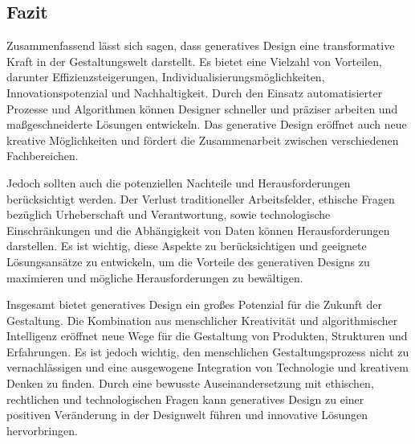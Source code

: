  \subsection*{Fazit}

 Zusammenfassend lässt sich sagen, dass generatives Design eine transformative Kraft in der Gestaltungswelt darstellt. Es bietet eine Vielzahl von Vorteilen, darunter Effizienzsteigerungen, Individualisierungsmöglichkeiten, Innovationspotenzial und Nachhaltigkeit. Durch den Einsatz automatisierter Prozesse und Algorithmen können Designer schneller und präziser arbeiten und maßgeschneiderte Lösungen entwickeln. Das generative Design eröffnet auch neue kreative Möglichkeiten und fördert die Zusammenarbeit zwischen verschiedenen Fachbereichen.

 Jedoch sollten auch die potenziellen Nachteile und Herausforderungen berücksichtigt werden. Der Verlust traditioneller Arbeitsfelder, ethische Fragen bezüglich Urheberschaft und Verantwortung, sowie technologische Einschränkungen und die Abhängigkeit von Daten können Herausforderungen darstellen. Es ist wichtig, diese Aspekte zu berücksichtigen und geeignete Lösungsansätze zu entwickeln, um die Vorteile des generativen Designs zu maximieren und mögliche Herausforderungen zu bewältigen.
 
 Insgesamt bietet generatives Design ein großes Potenzial für die Zukunft der Gestaltung. Die Kombination aus menschlicher Kreativität und algorithmischer Intelligenz eröffnet neue Wege für die Gestaltung von Produkten, Strukturen und Erfahrungen. Es ist jedoch wichtig, den menschlichen Gestaltungsprozess nicht zu vernachlässigen und eine ausgewogene Integration von Technologie und kreativem Denken zu finden. Durch eine bewusste Auseinandersetzung mit ethischen, rechtlichen und technologischen Fragen kann generatives Design zu einer positiven Veränderung in der Designwelt führen und innovative Lösungen hervorbringen.
